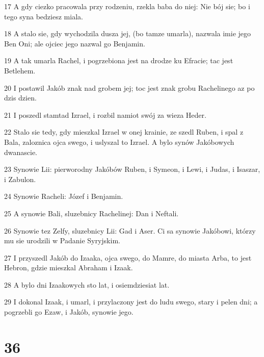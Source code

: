 \par 17 A gdy ciezko pracowala przy rodzeniu, rzekla baba do niej: Nie bój sie; bo i tego syna bedziesz miala.
\par 18 A stalo sie, gdy wychodzila dusza jej, (bo tamze umarla), nazwala imie jego Ben Oni; ale ojciec jego nazwal go Benjamin.
\par 19 A tak umarla Rachel, i pogrzebiona jest na drodze ku Efracie; tac jest Betlehem.
\par 20 I postawil Jakób znak nad grobem jej; toc jest znak grobu Rachelinego az po dzis dzien.
\par 21 I poszedl stamtad Izrael, i rozbil namiot swój za wieza Heder.
\par 22 Stalo sie tedy, gdy mieszkal Izrael w onej krainie, ze szedl Ruben, i spal z Bala, zaloznica ojca swego, i uslyszal to Izrael. A bylo synów Jakóbowych dwanascie.
\par 23 Synowie Lii: pierworodny Jakóbów Ruben, i Symeon, i Lewi, i Judas, i Isaszar, i Zabulon.
\par 24 Synowie Racheli: Józef i Benjamin.
\par 25 A synowie Bali, sluzebnicy Rachelinej: Dan i Neftali.
\par 26 Synowie tez Zelfy, sluzebnicy Lii: Gad i Aser. Ci sa synowie Jakóbowi, którzy mu sie urodzili w Padanie Syryjskim.
\par 27 I przyszedl Jakób do Izaaka, ojca swego, do Mamre, do miasta Arba, to jest Hebron, gdzie mieszkal Abraham i Izaak.
\par 28 A bylo dni Izaakowych sto lat, i osiemdziesiat lat.
\par 29 I dokonal Izaak, i umarl, i przylaczony jest do ludu swego, stary i pelen dni; a pogrzebli go Ezaw, i Jakób, synowie jego.

\chapter{36}


